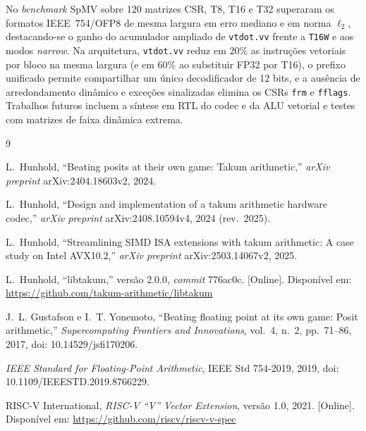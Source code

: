 \documentclass[journal]{IEEEtran}
\begin{document}
No \emph{benchmark} SpMV sobre 120 matrizes CSR, T8, T16 e T32 superaram os
formatos IEEE~754/OFP8 de mesma largura em erro mediano e em norma $\ell_2$,
destacando-se o ganho do acumulador ampliado de \texttt{vtdot.vv} frente a
\texttt{T16W} e aos modos \emph{narrow}. Na arquitetura, \texttt{vtdot.vv}
reduz em 20\% as instruções vetoriais por bloco na mesma largura (e em 60\% ao
substituir FP32 por T16), o prefixo unificado permite compartilhar um único
decodificador de 12 bits, e a ausência de arredondamento dinâmico e exceções
sinalizadas elimina os CSRs \texttt{frm} e \texttt{fflags}. Trabalhos futuros
incluem a síntese em RTL do codec e da ALU vetorial e testes com matrizes de
faixa dinâmica extrema.

\begin{thebibliography}{9}

L.~Hunhold, ``Beating posits at their own game: Takum arithmetic,''
\emph{arXiv preprint} arXiv:2404.18603v2, 2024.

L.~Hunhold, ``Design and implementation of a takum arithmetic hardware
codec,'' \emph{arXiv preprint} arXiv:2408.10594v4, 2024 (rev.\ 2025).

L.~Hunhold, ``Streamlining SIMD ISA extensions with takum arithmetic: A
case study on Intel AVX10.2,'' \emph{arXiv preprint} arXiv:2503.14067v2, 2025.

L.~Hunhold, ``libtakum,'' versão 2.0.0, \emph{commit} 776ac0c. [Online].
Disponível em: \url{https://github.com/takum-arithmetic/libtakum}

J.~L. Gustafson e I.~T. Yonemoto, ``Beating floating point at its own
game: Posit arithmetic,'' \emph{Supercomputing Frontiers and Innovations},
vol.~4, n.~2, pp.~71--86, 2017, doi: 10.14529/jsfi170206.

\emph{IEEE Standard for Floating-Point Arithmetic}, IEEE Std 754-2019, 2019,
doi: 10.1109/IEEESTD.2019.8766229.

RISC-V International, \emph{RISC-V ``V'' Vector Extension}, versão 1.0,
2021. [Online]. Disponível em:
\url{https://github.com/riscv/riscv-v-spec}

\end{thebibliography}
\end{document}
